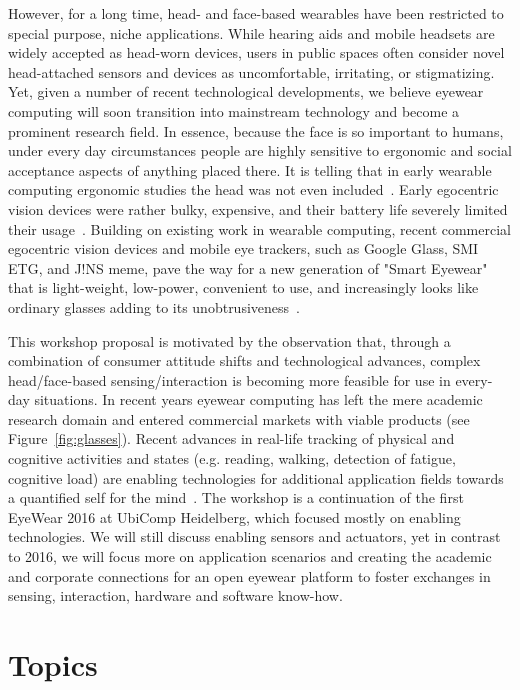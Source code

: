 \documentclass{sigchi-ext}
\begin{document}
However, for a long time, head- and face-based wearables have been restricted to special purpose, niche applications.  While hearing aids and mobile headsets are widely accepted as head-worn devices, users in public spaces often consider novel head-attached sensors and devices as uncomfortable, irritating, or stigmatizing. Yet, given a number of recent technological developments, we believe eyewear computing will soon transition into mainstream technology and become a prominent research field. In essence, because the face is so important to humans, under every day circumstances people are highly sensitive to ergonomic and social acceptance aspects of anything placed there. It is telling that in early wearable computing ergonomic studies the head was not even included~\cite{bodine2003effects}. Early egocentric vision devices were rather bulky, expensive, and their battery life severely limited their usage~\cite{cakmakci2006head}. Building on existing work in wearable computing, recent commercial egocentric vision devices and mobile eye trackers, such as Google Glass, SMI ETG, and J!NS meme, pave the way for a new generation of "Smart Eyewear" that is light-weight, low-power, convenient to use, and increasingly looks like ordinary glasses adding to its unobtrusiveness~\cite{bulling2014cognition,kliegl2006tracking}.

This workshop proposal is motivated by the observation that, through a combination of consumer attitude shifts and technological advances, complex head/face-based sensing/interaction is becoming more feasible for use in every-day situations. In recent years eyewear computing has left the mere academic research domain and entered commercial markets with viable products (see Figure~\ref{fig:glasses}). Recent advances in real-life tracking of physical and cognitive activities and states (e.g. reading, walking, detection of fatigue, cognitive load) are enabling technologies for additional application fields towards a quantified self for the mind~\cite{kunze2015quantifying}.
The workshop is a continuation of the first EyeWear 2016 at UbiComp Heidelberg, which focused mostly on enabling technologies. We will still discuss enabling sensors and actuators, yet in contrast to 2016, we will focus more on application scenarios and creating the academic and corporate connections for an open eyewear platform to foster exchanges in sensing, interaction, hardware and software know-how.

\section{Topics}
\end{document}
